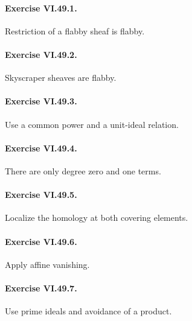 \paragraph{Exercise VI.49.1.}
\begin{hint}
Restriction of a flabby sheaf is flabby.
\end{hint}

\paragraph{Exercise VI.49.2.}
\begin{hint}
Skyscraper sheaves are flabby.
\end{hint}

\paragraph{Exercise VI.49.3.}
\begin{hint}
Use a common power and a unit-ideal relation.
\end{hint}

\paragraph{Exercise VI.49.4.}
\begin{hint}
There are only degree zero and one terms.
\end{hint}

\paragraph{Exercise VI.49.5.}
\begin{hint}
Localize the homology at both covering elements.
\end{hint}

\paragraph{Exercise VI.49.6.}
\begin{hint}
Apply affine vanishing.
\end{hint}

\paragraph{Exercise VI.49.7.}
\begin{hint}
Use prime ideals and avoidance of a product.
\end{hint}


